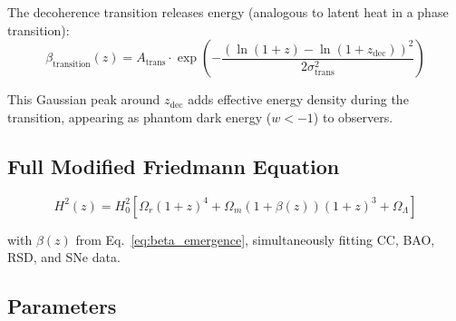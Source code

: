 \documentclass[twocolumn,prd,superscriptaddress,nofootinbib]{revtex4-2}
\begin{document}
The decoherence transition releases energy (analogous to latent heat in a phase transition):
\begin{equation}
\beta_\text{transition}(z) = A_\text{trans} \cdot \exp\left(-\frac{(\ln(1+z) - \ln(1+z_\text{dec}))^2}{2\sigma_\text{trans}^2}\right)
\label{eq:transition}
\end{equation}

This Gaussian peak around $z_\text{dec}$ adds effective energy density during the transition, appearing as phantom dark energy ($w < -1$) to observers.

\subsection{Full Modified Friedmann Equation}

\begin{equation}
H^2(z) = H_0^2\left[\Omega_r(1+z)^4 + \Omega_m(1+\beta(z))(1+z)^3 + \Omega_\Lambda\right]
\end{equation}

with $\beta(z)$ from Eq.~\ref{eq:beta_emergence}, simultaneously fitting CC, BAO, RSD, and SNe data.

\subsection{Parameters}
\end{document}
